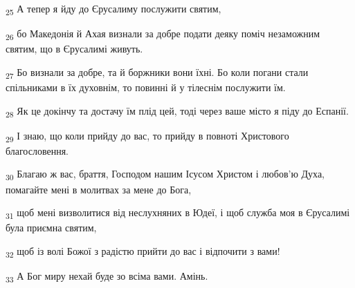 \begin{tcolorbox}
\textsubscript{25} А тепер я йду до Єрусалиму послужити святим,
\end{tcolorbox}
\begin{tcolorbox}
\textsubscript{26} бо Македонія й Ахая визнали за добре подати деяку поміч незаможним святим, що в Єрусалимі живуть.
\end{tcolorbox}
\begin{tcolorbox}
\textsubscript{27} Бо визнали за добре, та й боржники вони їхні. Бо коли погани стали спільниками в їх духовнім, то повинні й у тілеснім послужити їм.
\end{tcolorbox}
\begin{tcolorbox}
\textsubscript{28} Як це докінчу та достачу їм плід цей, тоді через ваше місто я піду до Еспанії.
\end{tcolorbox}
\begin{tcolorbox}
\textsubscript{29} І знаю, що коли прийду до вас, то прийду в повноті Христового благословення.
\end{tcolorbox}
\begin{tcolorbox}
\textsubscript{30} Благаю ж вас, браття, Господом нашим Ісусом Христом і любов'ю Духа, помагайте мені в молитвах за мене до Бога,
\end{tcolorbox}
\begin{tcolorbox}
\textsubscript{31} щоб мені визволитися від неслухняних в Юдеї, і щоб служба моя в Єрусалимі була приємна святим,
\end{tcolorbox}
\begin{tcolorbox}
\textsubscript{32} щоб із волі Божої з радістю прийти до вас і відпочити з вами!
\end{tcolorbox}
\begin{tcolorbox}
\textsubscript{33} А Бог миру нехай буде зо всіма вами. Амінь.
\end{tcolorbox}
